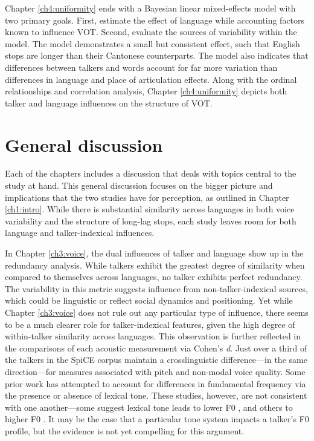Chapter \ref{ch4:uniformity} ends with a Bayesian linear mixed-effects model with two primary goals. First, estimate the effect of language while accounting factors known to influence VOT. Second, evaluate the sources of variability within the model. The model demonstrates a small but consistent effect, such that English stops are longer than their Cantonese counterparts. The model also indicates that differences between talkers and words account for far more variation than differences in language and place of articulation effects. Along with the ordinal relationships and correlation analysis, Chapter \ref{ch4:uniformity} depicts both talker and language influences on the structure of VOT. 

\section{General discussion}\label{ch5:sec:discussion}

Each of the chapters includes a discussion that deals with topics central to the study at hand. This general discussion focuses on the bigger picture and implications that the two studies have for perception, as outlined in Chapter \ref{ch1:intro}. While there is substantial similarity across languages in both voice variability and the structure of long-lag stops, each study leaves room for both language and talker-indexical influences. 

In Chapter \ref{ch3:voice}, the dual influences of talker and language show up in the redundancy analysis. While talkers exhibit the greatest degree of similarity when compared to themselves across languages,  no talker exhibits perfect redundancy. The variability in this metric suggests influence from non-talker-indexical sources, which could be linguistic or reflect social dynamics and positioning. Yet while Chapter \ref{ch3:voice} does not rule out any particular type of influence, there seems to be a much clearer role for talker-indexical features, given the high degree of within-talker similarity across languages. This observation is further reflected in the comparisons of each acoustic measurement via Cohen's \textit{d}. Just over a third of the talkers in the SpiCE corpus maintain a crosslinguistic difference---in the same direction---for measures associated with pitch and non-modal voice quality. Some prior work has attempted to account for differences in fundamental frequency via the presence or absence of lexical tone. These studies, however, are not consistent with one another---some suggest lexical tone leads to lower F0 \citep{ng_2012_ltas}, and others to higher F0 \citep{lee_2017_bilingual, keating_2012_f0}. It may be the case that a particular tone system impacts a talker's F0 profile, but the evidence is not yet compelling for this argument. 

